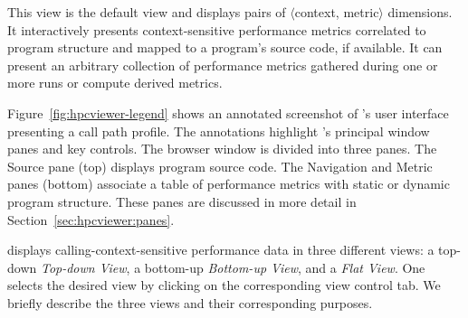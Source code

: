 This view is the default view and displays pairs of $\langle$context, metric$\rangle$ dimensions.
It interactively presents context-sensitive performance metrics correlated to program structure and mapped to a program's source code, if available.
It can present an arbitrary collection of performance metrics gathered during one or more runs or compute derived metrics.

Figure~\ref{fig:hpcviewer-legend} shows an annotated screenshot of \hpcviewer{}'s user interface presenting a call path profile.
The annotations highlight \hpcviewer{}'s principal window panes and key controls.
The browser window is divided into three panes.
The Source pane (top) displays program source code.
The Navigation and Metric panes (bottom) associate a table of performance metrics with static or dynamic program structure.
These panes are discussed in more detail in Section~\ref{sec:hpcviewer:panes}.

\hpcviewer{} displays calling-context-sensitive performance data in three different views: a top-down \emph{Top-down View}, a bottom-up \emph{Bottom-up View}, and a \emph{Flat View}.
One selects the desired view by clicking on the corresponding view control tab.
We briefly describe the three views and their corresponding purposes.

